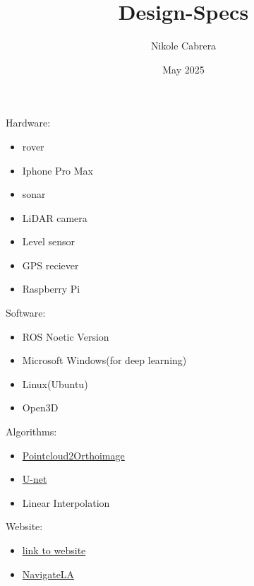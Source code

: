 \documentclass{article}
\title{Design-Specs}
\author{Nikole Cabrera}
\date{May 2025}
\begin{document}
\maketitle

Hardware:
\begin{itemize}
  \item rover
  \item Iphone Pro Max
  \item sonar
  \item LiDAR camera
  \item Level sensor
  \item GPS reciever
  \item Raspberry Pi
\end{itemize}
\vfill
Software:
\begin{itemize}
    \item ROS Noetic Version
  \item Microsoft Windows(for deep learning)
  \item Linux(Ubuntu)
  \item Open3D 
\end{itemize}
\vfill
Algorithms:
\begin{itemize}
    \item \href{https://github.com/J-APV/pointcloud2orthoimage/blob/main/Pointcloud2OrthoimageToolV1}{Pointcloud2Orthoimage}
    \item \href{https://github.com/J-APV/unet-image-segmentation/tree/master}{U-net}
    \item Linear Interpolation
\end{itemize}
\vfill
Website:
\begin{itemize}
    \item \href{https://main.d3oubwplxqirtt.amplifyapp.com/}{link to website}
    \item \href{https://navigatela.lacity.org/navigatela/}{NavigateLA}
\end{itemize}
    
\end{document}
